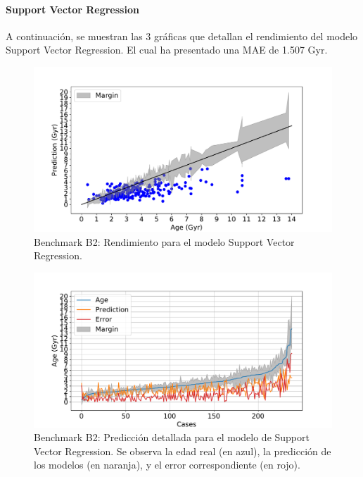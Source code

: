 \paragraph{Support Vector Regression} 
A continuación, se muestran las 3 gráficas que detallan el rendimiento del modelo Support Vector Regression. El cual ha presentado una MAE de 1.507 Gyr.

\begin{figure}[H]
\begin{center}
 \includegraphics[width=0.8\linewidth]{Figuras/Experimentos/B_B2_svm_1.pdf}
\end{center}
\caption{Benchmark B2: Rendimiento para el modelo Support Vector Regression.}
 \label{fig:benchB2_details_svm_1}
\end{figure}

\begin{figure}[H]
\begin{center}
 \includegraphics[width=0.8\linewidth]{Figuras/Experimentos/B_B2_svm_2.pdf}
\end{center}
\caption{Benchmark B2: Predicción detallada para el modelo de Support Vector Regression. Se observa la edad real (en azul), la predicción de los modelos (en naranja), y el error correspondiente (en rojo).}
 \label{fig:benchB2_details_svm_2}
\end{figure}


